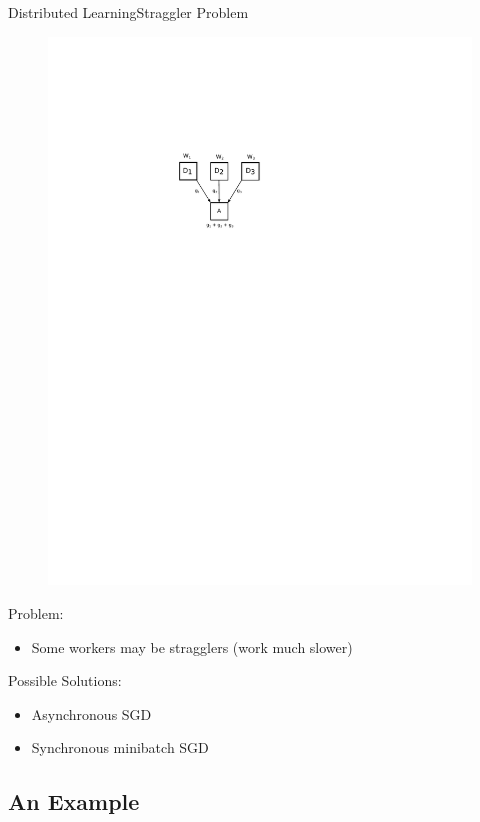 \documentclass{beamer}
\begin{document}
\begin{frame}{Distributed Learning}{Straggler Problem}

\begin{figure}
    \centering
    \includegraphics[height=.5\textheight]{res/distributed_learning.pdf}
\end{figure}

Problem:
\begin{itemize}
    \item Some workers may be stragglers (work much slower)
\end{itemize}

Possible Solutions:
\begin{itemize}
    \item Asynchronous SGD
    \item Synchronous minibatch SGD
\end{itemize}

\end{frame}

\subsection{An Example}
\end{document}
